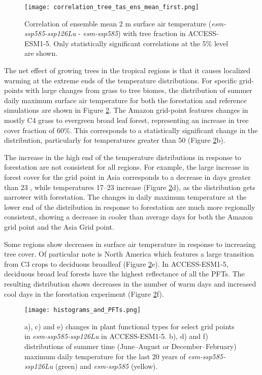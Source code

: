 \documentclass[draft]{agujournal2019}
\begin{document}
\begin{figure}
    \texttt{[image: correlation\_tree\_tas\_ens\_mean\_first.png]}
    \caption{Correlation of ensemble mean 2 m surface air temperature (\textit{esm-ssp585-ssp126Lu} - \textit{esm-ssp585}) with tree fraction in ACCESS-ESM1-5. Only statistically significant correlations at the 5\% level are shown.}
    \label{fig:map_tas_tree_correlation}
\end{figure}

The net effect of growing trees in the tropical regions is that it causes localized warming at the extreme ends of the temperature distributions.
For specific grid-points with large changes from grass to tree biomes, the distribution of summer daily maximum surface air temperature for both the forestation and reference simulations are shown in Figure \ref{fig:tasmax_distribution}.
The Amazon grid-point features changes in mostly C4 grass to evergreen broad leaf forest, representing an increase in tree cover fraction of 60\%.
This corresponds to a statistically significant change in the distribution, particularly for temperatures greater than 50 \textcelsius{} (Figure \ref{fig:tasmax_distribution}b).

The increase in the high end of the temperature distributions in response to forestation are not consistent for all regions.
For example, the large increase in forest cover for the grid point in Asia corresponds to a decrease in days greater than 23 \textcelsius{}, while temperatures 17--23 \textcelsius{} increase (Figure \ref{fig:tasmax_distribution}d), as the distribution gets narrower with forestation.
The changes in daily maximum temperature at the lower end of the distribution in response to forestation are much more regionally consistent, showing a decrease in cooler than average days for both the Amazon grid point and the Asia Grid point.

Some regions show decreases in surface air temperature in response to increasing tree cover.
Of particular note is North America which features a large transition from C3 crops to deciduous broadleaf (Figure \ref{fig:tasmax_distribution}e).
In ACCESS-ESM1-5, deciduous broad leaf forests have the highest reflectance of all the PFTs.
The resulting distribution shows decreases in the number of warm days and increased cool days in the forestation experiment (Figure \ref{fig:tasmax_distribution}f).

\begin{figure}
    \texttt{[image: histograms\_and\_PFTs.png]}
    \caption{a), c) and e) changes in plant functional types for select grid points in \textit{esm-ssp585-ssp126Lu} in ACCESS-ESM1-5. b), d) and f) distributions of summer time (June--August or December--February) maximum daily temperature for the last 20 years of \textit{esm-ssp585-ssp126Lu} (green) and \textit{esm-ssp585} (yellow).}
    \label{fig:tasmax_distribution}
\end{figure}
\end{document}
